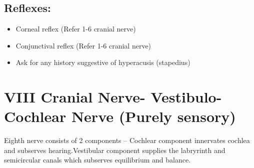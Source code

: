 \documentclass[a4paper,12pt,openany,twoside]{book}
\begin{document}
\subsection*{Reflexes:}
		\begin{itemize}
\item{Corneal reflex (Refer 1-6 cranial nerve)}
\item{Conjunctival reflex (Refer 1-6 cranial nerve)}
\item{Ask for any history suggestive of hyperacusis (stapedius)}
		\end{itemize}

		\section*{VIII Cranial Nerve- Vestibulo-Cochlear Nerve (Purely sensory)}

	Eighth nerve consists of 2 components – Cochlear component innervates cochlea and subserves hearing.Vestibular component supplies the labryrinth and semicircular canals which subserves equilibrium and balance.
\end{document}
